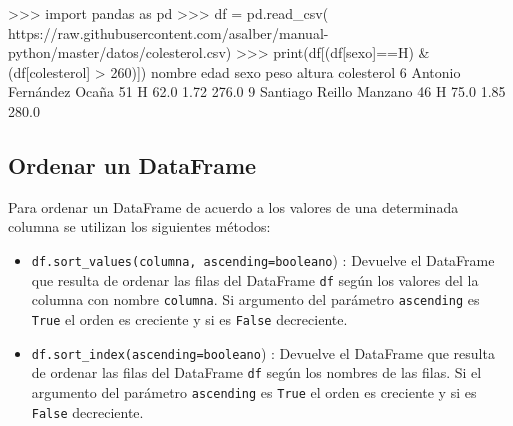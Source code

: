 \documentclass[
  spanish,
  a4paper,
]{scrreport}
\newenvironment{Shaded}{\begin{snugshade}}{\end{snugshade}}
\newcommand{\BuiltInTok}[1]{\textcolor[rgb]{0.00,0.23,0.31}{#1}}
\newcommand{\DecValTok}[1]{\textcolor[rgb]{0.68,0.00,0.00}{#1}}
\newcommand{\FloatTok}[1]{\textcolor[rgb]{0.68,0.00,0.00}{#1}}
\newcommand{\ImportTok}[1]{\textcolor[rgb]{0.00,0.46,0.62}{#1}}
\newcommand{\NormalTok}[1]{\textcolor[rgb]{0.00,0.23,0.31}{#1}}
\newcommand{\OperatorTok}[1]{\textcolor[rgb]{0.37,0.37,0.37}{#1}}
\newcommand{\StringTok}[1]{\textcolor[rgb]{0.13,0.47,0.30}{#1}}
\begin{document}
\begin{Shaded}
\begin{Highlighting}[]
\OperatorTok{\textgreater{}\textgreater{}\textgreater{}} \ImportTok{import}\NormalTok{ pandas }\ImportTok{as}\NormalTok{ pd}
\OperatorTok{\textgreater{}\textgreater{}\textgreater{}}\NormalTok{ df }\OperatorTok{=}\NormalTok{ pd.read\_csv(}
\StringTok{\textquotesingle{}https://raw.githubusercontent.com/asalber/manual{-}python/master/datos/colesterol.csv\textquotesingle{}}\NormalTok{)}
\OperatorTok{\textgreater{}\textgreater{}\textgreater{}} \BuiltInTok{print}\NormalTok{(df[(df[}\StringTok{\textquotesingle{}sexo\textquotesingle{}}\NormalTok{]}\OperatorTok{==}\StringTok{\textquotesingle{}H\textquotesingle{}}\NormalTok{) }\OperatorTok{\&}\NormalTok{ (df[}\StringTok{\textquotesingle{}colesterol\textquotesingle{}}\NormalTok{] }\OperatorTok{\textgreater{}} \DecValTok{260}\NormalTok{)])}
\NormalTok{                     nombre  edad sexo    peso  altura    colesterol}
\DecValTok{6}\NormalTok{   Antonio Fernández Ocaña    }\DecValTok{51}\NormalTok{    H    }\FloatTok{62.0}    \FloatTok{1.72}         \FloatTok{276.0}
\DecValTok{9}\NormalTok{   Santiago Reillo Manzano    }\DecValTok{46}\NormalTok{    H    }\FloatTok{75.0}    \FloatTok{1.85}         \FloatTok{280.0}
\end{Highlighting}
\end{Shaded}

\subsection{Ordenar un DataFrame}\label{ordenar-un-dataframe}

Para ordenar un DataFrame de acuerdo a los valores de una determinada
columna se utilizan los siguientes métodos:

\begin{itemize}
\item
  \texttt{df.sort\_values(columna,\ ascending=booleano}) : Devuelve el
  DataFrame que resulta de ordenar las filas del DataFrame \texttt{df}
  según los valores del la columna con nombre \texttt{columna}. Si
  argumento del parámetro \texttt{ascending} es \texttt{True} el orden
  es creciente y si es \texttt{False} decreciente.
\item
  \texttt{df.sort\_index(ascending=booleano}) : Devuelve el DataFrame
  que resulta de ordenar las filas del DataFrame \texttt{df} según los
  nombres de las filas. Si el argumento del parámetro \texttt{ascending}
  es \texttt{True} el orden es creciente y si es \texttt{False}
  decreciente.
\end{itemize}
\end{document}
